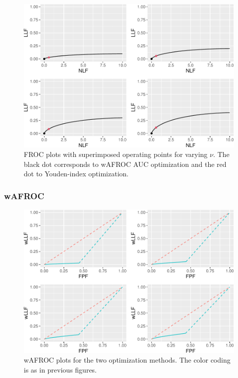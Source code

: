 \documentclass[
]{book}
\begin{document}
\begin{figure}
\centering
\includegraphics{22-optim-op-point_files/figure-latex/optim-op-point-low-performance-vary-nu-vary-all-froc-1.pdf}
\caption{\label{fig:optim-op-point-low-performance-vary-nu-vary-all-froc}FROC plots with superimposed operating points for varying \(\nu\). The black dot corresponds to wAFROC AUC optimization and the red dot to Youden-index optimization.}
\end{figure}

\hypertarget{wafroc-10}{%
\subsubsection{wAFROC}\label{wafroc-10}}

\begin{figure}
\centering
\includegraphics{22-optim-op-point_files/figure-latex/optim-op-point-low-performance-vary-nu-vary-all-wafroc-1.pdf}
\caption{\label{fig:optim-op-point-low-performance-vary-nu-vary-all-wafroc}wAFROC plots for the two optimization methods. The color coding is as in previous figures.}
\end{figure}
\end{document}
